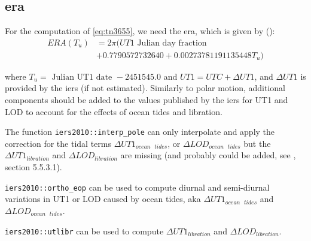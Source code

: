 \subsection{\acrfull{era}}
\label{ssec:earth-rotation-angle}
For the computation of \ref{eq:tn3655}, we need the \gls{era}, which is given by 
(\cite{iers2010}):
\begin{equation}
  \label{eq:tn36515}
  \begin{aligned}
  ERA(T_u ) &= 2 \pi ( UT1 \text{ Julian day fraction } \\
            &+ 0.7790572732640 + 0.00273781191135448 T_u )
  \end{aligned}
\end{equation}

where \(T_u = \text{ Julian UT1 date } - 2451545.0 \) and \( UT1 = UTC + \Delta UT1 \), 
and \(\Delta UT1 \) is provided by the \gls{iers} (if not estimated). Similarly 
to polar motion, additional components should be added to the values
published by the \gls{iers} for UT1 and LOD to account for the effects of ocean 
tides and libration.

The function \texttt{iers2010::interp\_pole} can only interpolate and apply the 
correction for the tidal terms \(\Delta UT1_{ocean\text{ }tides}\), or 
\(\Delta LOD_{ocean\text{ }tides}\) but the \(\Delta UT1_{libration}\) and 
\(\Delta LOD_{libration}\) are missing (and probably could be added, see \cite{iers2010}, 
section 5.5.3.1).

\texttt{iers2010::ortho\_eop} can be used to compute diurnal and
semi-diurnal variations in UT1 or LOD caused by ocean tides, aka 
\(\Delta UT1_{ocean\text{ }tides}\) and \(\Delta LOD_{ocean\text{ }tides}\).

\texttt{iers2010::utlibr} can be used to compute \(\Delta UT1_{libration}\) and 
\(\Delta LOD_{libration}\).

